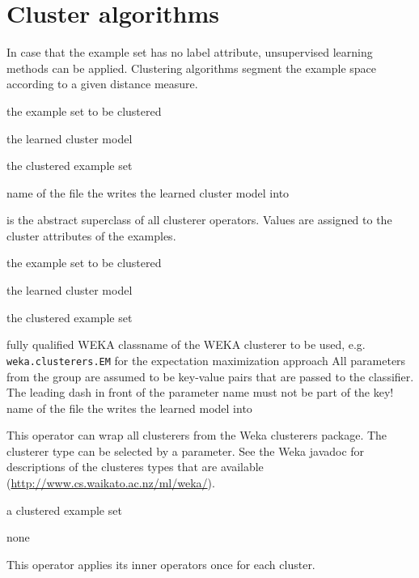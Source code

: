 \section{Cluster algorithms}

In case that the example set has no label attribute, unsupervised
learning methods can be applied. Clustering algorithms segment the
example space according to a given distance measure.




\newcommand{\clusterio}{
\begin{opin}
\item[ExampleSet:] the example set to be clustered
\end{opin}

\begin{opout}
\item[Model:] the learned cluster model
\item[ExampleSet:] the clustered example set
\end{opout}
}
\clusterio

\begin{parameters}
 name of the file the  writes the learned cluster model into
\end{parameters}

\opdescr {} is the abstract superclass of all clusterer
operators. Values are assigned to the cluster attributes of the examples.




\clusterio

\begin{parameters}
 fully qualified WEKA classname of the WEKA clusterer to be used, 
e.g. \texttt{weka.clusterers.EM} for the expectation maximization approach
\optpar All parameters from the group  are
assumed to be key-value pairs that are passed to the classifier. The
leading dash in front of the parameter name must not be part of the key!
 name of the file the  writes the learned model into
\end{parameters}

\opdescr This operator can wrap all clusterers from the Weka clusterers
package. The clusterer type can be selected by a parameter. 
See the Weka javadoc for descriptions of the clusteres types 
that are available (\url{http://www.cs.waikato.ac.nz/ml/weka/}).




\begin{opin}
\item[ExampleSet] a clustered example set
\end{opin}

\begin{opout}
\item none
\end{opout}

\opdescr This operator applies its inner operators once for each cluster.
